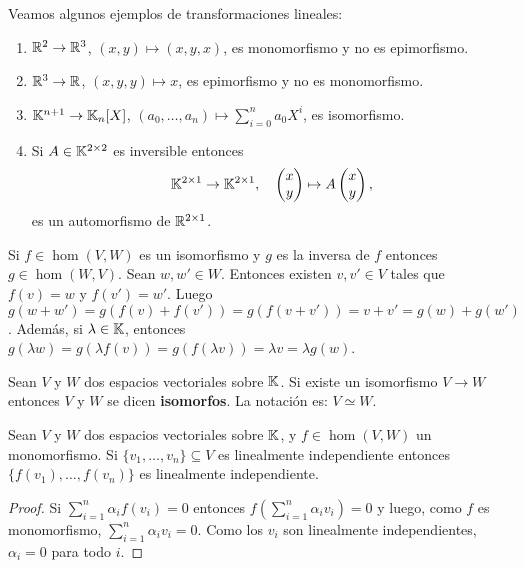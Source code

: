 \begin{examples}
	Veamos algunos ejemplos de transformaciones lineales:
	\begin{enumerate}
		\item $\mathbb{R}^2\to\mathbb{R}^3$, $(x,y)\mapsto(x,y,x)$, es monomorfismo y no es epimorfismo.
		\item $\mathbb{R}^3\to\mathbb{R}$, $(x,y,y)\mapsto x$, es epimorfismo y no es monomorfismo. 
		\item $\mathbb{K}^{n+1}\to\mathbb{K}_n[X]$, $(a_0,\dots,a_n)\mapsto\sum_{i=0}^na_0X^i$, es isomorfismo.
		\item Si $A\in\mathbb{K}^{2\times2}$ es inversible entonces
			\[
				\mathbb{K}^{2\times1}\to\mathbb{K}^{2\times1},
				\quad			
				\begin{pmatrix}x\\y\end{pmatrix}\mapsto
				A\begin{pmatrix}x\\y\end{pmatrix},
			\]
			es un automorfismo de $\mathbb{R}^{2\times1}$.
	\end{enumerate}
\end{examples}

\begin{block}
	Si $f\in\hom(V,W)$ es un isomorfismo y $g$ es la inversa de $f$ entonces
	$g\in\hom(W,V)$. Sean $w,w'\in W$. Entonces existen $v,v'\in V$ tales que
	$f(v)=w$ y $f(v')=w'$. Luego
	$g(w+w')=g(f(v)+f(v'))=g(f(v+v'))=v+v'=g(w)+g(w')$. Además, si
	$\lambda\in\mathbb{K}$, entonces $g(\lambda w)=g(\lambda f(v))=g(f(\lambda
	v))=\lambda v=\lambda g(w)$.
\end{block}

\begin{block}
	Sean $V$ y $W$ dos espacios vectoriales sobre $\mathbb{K}$. Si existe un
	isomorfismo $V\to W$ entonces $V$ y $W$ se dicen \textbf{isomorfos}. La
	notación es: $V\simeq W$.
\end{block}

\begin{lem}
	\label{lem:mono}
	Sean $V$ y $W$ dos espacios vectoriales sobre $\mathbb{K}$, y $f\in\hom(V,W)$ un
	monomorfismo.  Si $\{v_1,\dots,v_n\}\subseteq V$ es linealmente
	independiente entonces $\{f(v_1),\dots,f(v_n)\}$ es linealmente
	independiente.

	\begin{proof}
		Si $\sum_{i=1}^n\alpha_if(v_i)=0$ entonces
		$f\left(\sum_{i=1}^n\alpha_iv_i\right)=0$ y luego, como $f$ es
		monomorfismo, $\sum_{i=1}^n\alpha_iv_i=0$. Como los $v_i$ son
		linealmente independientes, $\alpha_i=0$ para todo $i$.
	\end{proof}
\end{lem}

